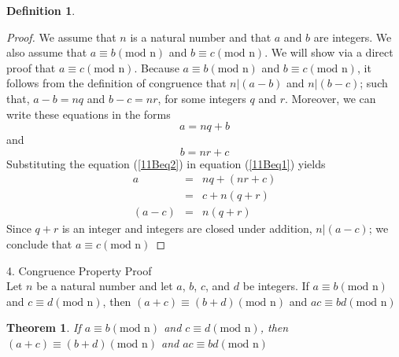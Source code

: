 \documentclass{book}
\newtheorem{theorem}{Theorem}[section]
\theoremstyle{definition}
\newtheorem{definition}{Definition}[section]
\theoremstyle{remark}
\begin{document}
\begin{definition}
\begin{proof}

We assume that $n$ is a natural number and that $a$ and $b$ are integers. We also assume that $a \equiv b (\text{mod n})$ and $b \equiv c (\text{mod n})$. We will show via a direct proof that $a \equiv c (\text{mod n})$. Because $a \equiv b (\text{mod n})$ and $b \equiv c (\text{mod n})$, it follows from the definition of congruence that $n|(a-b)$ and $n|(b-c)$; such that, $a-b = nq$ and $b-c = nr$, for some integers $q$ and $r$. Moreover, we can write these equations in the forms 
	\begin{equation}
	\label{11Beq1}	
		a = nq + b
	\end{equation}
and 
	\begin{equation}
	\label{11Beq2}
		b = nr + c
	\end{equation}
Substituting the equation (\ref{11Beq2}) in equation (\ref{11Beq1}) yields
	\begin{eqnarray}
		a & = & nq + (nr + c) \nonumber \\
		& = & c + n(q+r) \nonumber \\
		(a-c)& = & n(q+r) \nonumber
	\end{eqnarray}
Since $q+r$ is an integer and integers are closed under addition, $n | (a-c)$; we conclude that $a \equiv c (\text{mod n})$

\end{proof}
\end{definition}



4. Congruence Property Proof \\ 
Let $n$ be a natural number and let $a$, $b$, $c$, and $d$ be integers. If $a \equiv b (\text{mod n})$ and $c \equiv d (\text{mod n})$, then $(a + c) \equiv (b + d) (\text{mod n})$ and $ac \equiv bd (\text{mod n})$ \\

\begin{tcolorbox}
	\begin{theorem}
		If $a \equiv b (\text{mod n})$ and $c \equiv d (\text{mod n})$, then $(a + c) \equiv (b + d) (\text{mod n})$ and $ac \equiv bd (\text{mod n})$
	\end{theorem}
\end{tcolorbox}
\end{document}
